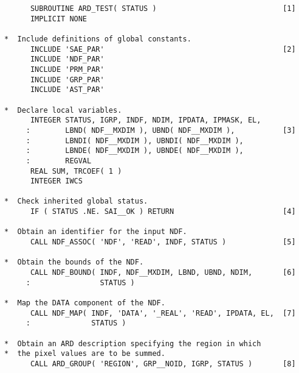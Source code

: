 \small
\begin{verbatim}
      SUBROUTINE ARD_TEST( STATUS )                             [1]
      IMPLICIT NONE                                           
                                                              
*  Include definitions of global constants.                   
      INCLUDE 'SAE_PAR'                                         [2]
      INCLUDE 'NDF_PAR'                                        
      INCLUDE 'PRM_PAR'                                        
      INCLUDE 'GRP_PAR'                                        
      INCLUDE 'AST_PAR'                                        
                                                              
*  Declare local variables.                                   
      INTEGER STATUS, IGRP, INDF, NDIM, IPDATA, IPMASK, EL,   
     :        LBND( NDF__MXDIM ), UBND( NDF__MXDIM ),           [3]
     :        LBNDI( NDF__MXDIM ), UBNDI( NDF__MXDIM ),       
     :        LBNDE( NDF__MXDIM ), UBNDE( NDF__MXDIM ),       
     :        REGVAL                                          
      REAL SUM, TRCOEF( 1 )                                   
      INTEGER IWCS
                                                              
*  Check inherited global status.                             
      IF ( STATUS .NE. SAI__OK ) RETURN                         [4]
                                                              
*  Obtain an identifier for the input NDF.                    
      CALL NDF_ASSOC( 'NDF', 'READ', INDF, STATUS )             [5]
                                                              
*  Obtain the bounds of the NDF.                              
      CALL NDF_BOUND( INDF, NDF__MXDIM, LBND, UBND, NDIM,       [6]
     :                STATUS )                                
                                                              
*  Map the DATA component of the NDF.                         
      CALL NDF_MAP( INDF, 'DATA', '_REAL', 'READ', IPDATA, EL,  [7]
     :              STATUS )                                  
                                                              
*  Obtain an ARD description specifying the region in which   
*  the pixel values are to be summed.                         
      CALL ARD_GROUP( 'REGION', GRP__NOID, IGRP, STATUS )       [8]
                                                              

\end{verbatim}

